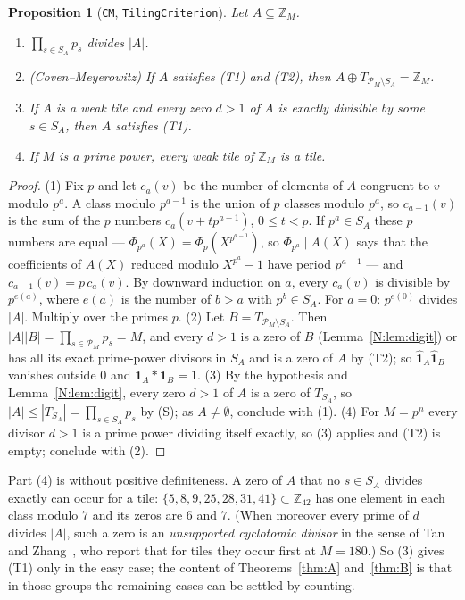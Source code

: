 \documentclass[11pt,a4paper]{amsart}
\newtheorem{proposition}[theorem]{Proposition}
\theoremstyle{definition}
\theoremstyle{remark}
\newcommand{\Z}{\mathbb{Z}}
\newcommand{\one}{\mathbf{1}}
\newcommand{\lean}[1]{\texttt{#1}}
\begin{document}
\begin{proposition}[\lean{CM}, \lean{TilingCriterion}]\label{N:prop:CM}
Let $A\subseteq\Z_M$.
\begin{enumerate}
\item $\prod_{s\in S_A}p_s$ divides $|A|$.
\item \textup{(Coven--Meyerowitz)} If $A$ satisfies \textup{(T1)} and \textup{(T2)}, then
 $A\oplus T_{\mathcal P_M\setminus S_A}=\Z_M$.
\item If $A$ is a weak tile and every zero $d>1$ of $A$ is exactly divisible by some $s\in S_A$, then $A$ satisfies
 \textup{(T1)}.
\item If $M$ is a prime power, every weak tile of $\Z_M$ is a tile.
\end{enumerate}
\end{proposition}
\begin{proof}
(1) Fix $p$ and let $c_a(v)$ be the number of elements of $A$ congruent to $v$ modulo $p^a$. A class modulo
$p^{a-1}$ is the union of $p$ classes modulo $p^a$, so $c_{a-1}(v)$ is the sum of the $p$ numbers
$c_a(v+tp^{a-1})$, $0\le t<p$. If $p^a\in S_A$ these $p$ numbers are equal --- $\Phi_{p^a}(X)=\Phi_p(X^{p^{a-1}})$,
so $\Phi_{p^a}\mid A(X)$ says that the coefficients of $A(X)$ reduced modulo $X^{p^a}-1$ have period $p^{a-1}$ ---
and $c_{a-1}(v)=p\,c_a(v)$. By downward induction on $a$, every $c_a(v)$ is divisible by $p^{e(a)}$, where $e(a)$ is
the number of $b>a$ with $p^b\in S_A$. For $a=0$: $p^{e(0)}$ divides $|A|$. Multiply over the primes $p$. (2) Let $B=T_{\mathcal P_M\setminus S_A}$.
Then $|A||B|=\prod_{s\in\mathcal P_M}p_s=M$, and every $d>1$ is a zero of $B$ (Lemma~\ref{N:lem:digit}) or has all
its exact prime-power divisors in $S_A$ and is a zero of $A$ by (T2); so $\hat{\one}_A\hat{\one}_B$ vanishes
outside $0$ and $\one_A*\one_B=1$. (3) By the hypothesis and Lemma~\ref{N:lem:digit}, every zero $d>1$ of $A$ is a zero of $T_{S_A}$, so
$|A|\le|T_{S_A}|=\prod_{s\in S_A}p_s$ by (S); as $A\ne\emptyset$, conclude with (1). (4) For $M=p^n$ every divisor $d>1$ is a prime
power dividing itself exactly, so (3) applies and (T2) is empty; conclude with (2).
\end{proof}

Part (4) is \cite[Prop.~4.1]{KLMS} without positive definiteness. A zero of $A$ that no $s\in S_A$ divides
exactly can occur for a tile: $\{5,8,9,25,28,31,41\}\subset\Z_{42}$ has one element in each class modulo $7$ and
its zeros are $6$ and $7$. (When moreover every prime of $d$ divides $|A|$, such a zero is an \emph{unsupported
cyclotomic divisor} in the sense of Tan and Zhang~\cite{TZ}, who report that for tiles they occur first at $M=180$.) So
(3) gives (T1) only in the easy case; the content of Theorems~\ref{thm:A} and~\ref{thm:B} is that in those groups the remaining cases can be settled
by counting.
\end{document}
